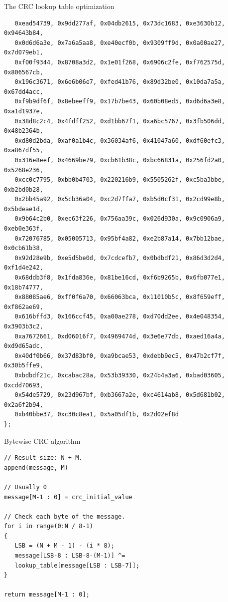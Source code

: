 \documentclass[10pt]{beamer}
\begin{document}
\begin{frame}[fragile]{The CRC lookup table optimization}   
\begin{scriptsize}
\begin{verbatim}
   0xead54739, 0x9dd277af, 0x04db2615, 0x73dc1683, 0xe3630b12, 0x94643b84,
   0x0d6d6a3e, 0x7a6a5aa8, 0xe40ecf0b, 0x9309ff9d, 0x0a00ae27, 0x7d079eb1,
   0xf00f9344, 0x8708a3d2, 0x1e01f268, 0x6906c2fe, 0xf762575d, 0x806567cb,
   0x196c3671, 0x6e6b06e7, 0xfed41b76, 0x89d32be0, 0x10da7a5a, 0x67dd4acc,
   0xf9b9df6f, 0x8ebeeff9, 0x17b7be43, 0x60b08ed5, 0xd6d6a3e8, 0xa1d1937e,
   0x38d8c2c4, 0x4fdff252, 0xd1bb67f1, 0xa6bc5767, 0x3fb506dd, 0x48b2364b,
   0xd80d2bda, 0xaf0a1b4c, 0x36034af6, 0x41047a60, 0xdf60efc3, 0xa867df55,
   0x316e8eef, 0x4669be79, 0xcb61b38c, 0xbc66831a, 0x256fd2a0, 0x5268e236,
   0xcc0c7795, 0xbb0b4703, 0x220216b9, 0x5505262f, 0xc5ba3bbe, 0xb2bd0b28,
   0x2bb45a92, 0x5cb36a04, 0xc2d7ffa7, 0xb5d0cf31, 0x2cd99e8b, 0x5bdeae1d,
   0x9b64c2b0, 0xec63f226, 0x756aa39c, 0x026d930a, 0x9c0906a9, 0xeb0e363f,
   0x72076785, 0x05005713, 0x95bf4a82, 0xe2b87a14, 0x7bb12bae, 0x0cb61b38,
   0x92d28e9b, 0xe5d5be0d, 0x7cdcefb7, 0x0bdbdf21, 0x86d3d2d4, 0xf1d4e242,
   0x68ddb3f8, 0x1fda836e, 0x81be16cd, 0xf6b9265b, 0x6fb077e1, 0x18b74777,
   0x88085ae6, 0xff0f6a70, 0x66063bca, 0x11010b5c, 0x8f659eff, 0xf862ae69,
   0x616bffd3, 0x166ccf45, 0xa00ae278, 0xd70dd2ee, 0x4e048354, 0x3903b3c2,
   0xa7672661, 0xd06016f7, 0x4969474d, 0x3e6e77db, 0xaed16a4a, 0xd9d65adc,
   0x40df0b66, 0x37d83bf0, 0xa9bcae53, 0xdebb9ec5, 0x47b2cf7f, 0x30b5ffe9,
   0xbdbdf21c, 0xcabac28a, 0x53b39330, 0x24b4a3a6, 0xbad03605, 0xcdd70693,
   0x54de5729, 0x23d967bf, 0xb3667a2e, 0xc4614ab8, 0x5d681b02, 0x2a6f2b94,
   0xb40bbe37, 0xc30c8ea1, 0x5a05df1b, 0x2d02ef8d
};
\end{verbatim}
\end{scriptsize}
\end{frame}


\begin{frame}[fragile]{Bytewise CRC algorithm}
\begin{verbatim}
// Result size: N + M.
append(message, M)

// Usually 0
message[M-1 : 0] = crc_initial_value

// Check each byte of the message.
for i in range(0:N / 8-1) 
{
   LSB = (N + M - 1) - (i * 8);
   message[LSB-8 : LSB-8-(M-1)] ^= 
   lookup_table[message[LSB : LSB-7]];
}

return message[M-1 : 0];
\end{verbatim}
\end{frame}
\end{document}
